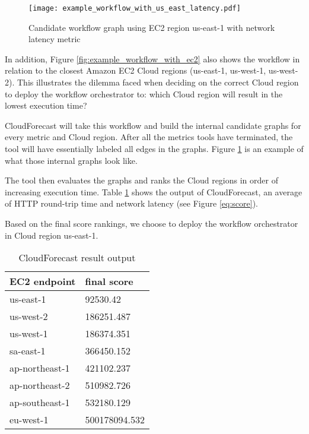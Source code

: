 \documentclass[10pt, conference, compsocconf]{IEEEtran}
\newcommand{\sysname}{CloudForecast\xspace}
\begin{document}
\begin{figure}[!t]
\centering
\texttt{[image: example\_workflow\_with\_us\_east\_latency.pdf]}

\caption{Candidate workflow graph using EC2 region us-east-1 with network latency metric}
\label{fig:labeled_candidate_graph}
\end{figure}


In addition, Figure \ref{fig:example_workflow_with_ec2} also shows the workflow in relation to the closest Amazon EC2 Cloud regions (us-east-1, us-west-1, us-west-2). This illustrates the dilemma faced when deciding on the correct Cloud region to deploy the workflow orchestrator to: which Cloud region will result in the lowest execution time?

\sysname will take this workflow and build the internal candidate graphs for every metric and Cloud region. After all the metrics tools have terminated, the tool will have essentially labeled all edges in the graphs. Figure \ref{fig:labeled_candidate_graph} is an example of what those internal graphs look like.



The tool then evaluates the graphs and ranks the Cloud regions in order of increasing execution time. Table \ref{fig:example_result_table} shows the output of \sysname, an average of HTTP round-trip time and network latency (see Figure \ref{eq:score}).

Based on the final score rankings, we choose to deploy the workflow orchestrator in Cloud region us-east-1.




\begin{table}[h]
\renewcommand{\arraystretch}{1.2}
\caption{\sysname result output}
\label{fig:example_result_table}
\centering
\begin{tabular}{|l|l|}
\hline
EC2 endpoint & final score\\
\hline
us-east-1 & 92530.42\\
us-west-2 & 186251.487\\
us-west-1 & 186374.351\\
sa-east-1 & 366450.152\\
ap-northeast-1 & 421102.237\\
ap-northeast-2 & 510982.726 \\
ap-southeast-1 & 532180.129\\
eu-west-1 &500178094.532\\
\hline
\end{tabular}
\end{table}
\end{document}
